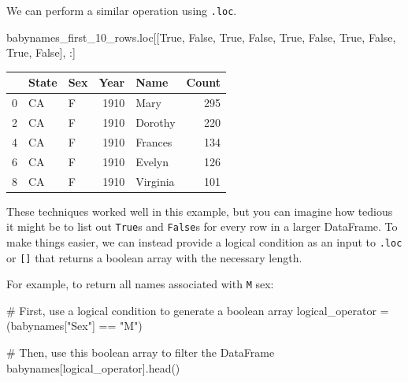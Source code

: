 \documentclass[
  letterpaper,
  DIV=11,
  numbers=noendperiod]{scrreprt}
\newenvironment{Shaded}{\begin{snugshade}}{\end{snugshade}}
\newcommand{\CommentTok}[1]{\textcolor[rgb]{0.37,0.37,0.37}{#1}}
\newcommand{\NormalTok}[1]{\textcolor[rgb]{0.00,0.23,0.31}{#1}}
\newcommand{\OperatorTok}[1]{\textcolor[rgb]{0.37,0.37,0.37}{#1}}
\newcommand{\StringTok}[1]{\textcolor[rgb]{0.13,0.47,0.30}{#1}}
\newcommand{\VariableTok}[1]{\textcolor[rgb]{0.07,0.07,0.07}{#1}}
\begin{document}
We can perform a similar operation using \texttt{.loc}.

\begin{Shaded}
\begin{Highlighting}[]
\NormalTok{babynames\_first\_10\_rows.loc[[}\VariableTok{True}\NormalTok{, }\VariableTok{False}\NormalTok{, }\VariableTok{True}\NormalTok{, }\VariableTok{False}\NormalTok{, }\VariableTok{True}\NormalTok{, }\VariableTok{False}\NormalTok{, }\VariableTok{True}\NormalTok{, }\VariableTok{False}\NormalTok{, }\VariableTok{True}\NormalTok{, }\VariableTok{False}\NormalTok{], :]}
\end{Highlighting}
\end{Shaded}

\begin{tabular}{lllrlr}
\toprule
{} & State & Sex &  Year &      Name &  Count \\
\midrule
0 &    CA &   F &  1910 &      Mary &    295 \\
2 &    CA &   F &  1910 &   Dorothy &    220 \\
4 &    CA &   F &  1910 &   Frances &    134 \\
6 &    CA &   F &  1910 &    Evelyn &    126 \\
8 &    CA &   F &  1910 &  Virginia &    101 \\
\bottomrule
\end{tabular}

These techniques worked well in this example, but you can imagine how
tedious it might be to list out \texttt{True}s and \texttt{False}s for
every row in a larger DataFrame. To make things easier, we can instead
provide a logical condition as an input to \texttt{.loc} or
\texttt{{[}{]}} that returns a boolean array with the necessary length.

For example, to return all names associated with \texttt{M} sex:

\begin{Shaded}
\begin{Highlighting}[]
\CommentTok{\# First, use a logical condition to generate a boolean array}
\NormalTok{logical\_operator }\OperatorTok{=}\NormalTok{ (babynames[}\StringTok{"Sex"}\NormalTok{] }\OperatorTok{==} \StringTok{"M"}\NormalTok{)}

\CommentTok{\# Then, use this boolean array to filter the DataFrame}
\NormalTok{babynames[logical\_operator].head()}
\end{Highlighting}
\end{Shaded}
\end{document}
